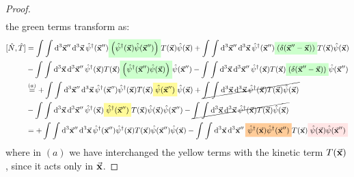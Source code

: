 \documentclass[11pt, a4paper, twoside, openright]{article}
\begin{document}
\begin{proof}
\begin{equation}
\begin{split}
\end{split}
\label{eq:commutator}
\end{equation}
the green terms transform as:
\begin{equation*}
\begin{split}
  [\hat{N},\hat{T}  ] &=
      \int_{}^{} \int_{}^{} \dd[3]{\va{x}''} \dd[3]{\va{x}}  \hat{\psi }^\dag (\va{x}'') \mathcolorbox{green!20}{  \qty(  \hat{\psi }^\dag (\va{x}) \hat{\psi } (\va{x}'') )
      }   T (\va{x}) \hat{\psi }(\va{x})
      + \int_{}^{} \int_{}^{} \dd[3]{\va{x}''} \dd[3]{\va{x}}  \hat{\psi }^\dag (\va{x}'') \mathcolorbox{green!20}{  \qty( \delta (\va{x}''-\va{x}) )
      }   T (\va{x}) \hat{\psi }(\va{x})
      \\
      &-
      \int_{}^{} \int_{}^{} \dd[3]{\va{x}} \dd[3]{\va{x}''} \hat{\psi } ^\dag  (\va{x}) T (\va{x}) \mathcolorbox{green!20}{ \qty( \hat{\psi }^\dag (\va{x}'') \hat{\psi } (\va{x})) } \hat{\psi }(\va{x}'')
      - \int_{}^{} \int_{}^{} \dd[3]{\va{x}} \dd[3]{\va{x}''} \hat{\psi } ^\dag  (\va{x}) T (\va{x}) \mathcolorbox{green!20}{  \qty( \delta (\va{x}''-\va{x}) ) } \hat{\psi }(\va{x}'') \\
      & \overset{(a)}{=}
      + \int_{}^{} \int_{}^{} \dd[3]{\va{x}''} \dd[3]{\va{x}}  \hat{\psi }^\dag (\va{x}'')  \hat{\psi }^\dag (\va{x}) T (\va{x}) \mathcolorbox{yellow!40}{\hat{\psi } (\va{x}'')}
       \hat{\psi }(\va{x})
      + \cancel{ \int_{}^{} \int_{}^{} \dd[3]{\va{x}} \dd[3]{\va{x}}  \hat{\psi }^\dag (\va{x}) T (\va{x}) \hat{\psi }(\va{x}) }
      \\
      &-
      \int_{}^{} \int_{}^{} \dd[3]{\va{x}} \dd[3]{\va{x}''} \hat{\psi } ^\dag  (\va{x})  \mathcolorbox{yellow!40}{ \hat{\psi }^\dag (\va{x}'') } T (\va{x})  \hat{\psi } (\va{x}) \hat{\psi }(\va{x}'')
      - \cancel{ \int_{}^{} \int_{}^{} \dd[3]{\va{x}} \dd[3]{\va{x}} \hat{\psi } ^\dag  (\va{x}) T (\va{x}) \hat{\psi }(\va{x}) }  \\
      & =
      + \int_{}^{} \int_{}^{} \dd[3]{\va{x}''} \dd[3]{\va{x}}  \hat{\psi }^\dag (\va{x}'')  \hat{\psi }^\dag (\va{x})
      T (\va{x}) \hat{\psi } (\va{x}'') \hat{\psi }(\va{x})
      -
      \int_{}^{} \int_{}^{} \dd[3]{\va{x}} \dd[3]{\va{x}''} \mathcolorbox{orange!40}{ \hat{\psi } ^\dag  (\va{x})   \hat{\psi }^\dag (\va{x}'') } T (\va{x})  \mathcolorbox{pink!40}{ \hat{\psi } (\va{x}) \hat{\psi }(\va{x}'') }
\end{split}
\end{equation*}
where in \( (a) \) we have interchanged the yellow terms with the kinetic term \( T(\va{x}) \), since it acts only in \( \va{x} \).

\end{proof}
\end{document}
